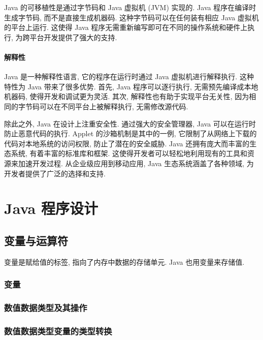 \documentclass[10pt,UTF8]{book} %
\begin{document}
Java 的可移植性是通过字节码和 Java 虚拟机 (JVM) 实现的. Java 程序在编译时生成字节码, 
而不是直接生成机器码. 这种字节码可以在任何装有相应 Java 虚拟机的平台上运行. 
这使得 Java 程序无需重新编写即可在不同的操作系统和硬件上执行, 为跨平台开发提供了强大的支持. 

\subsection{解释性}

Java 是一种解释性语言, 它的程序在运行时通过 Java 虚拟机进行解释执行. 
这种特性为 Java 带来了很多优势. 首先, Java 程序可以逐行执行, 
无需预先编译成本地机器码, 使得开发和调试更为灵活. 
其次, 解释性也有助于实现平台无关性, 因为相同的字节码可以在不同平台上被解释执行, 无需修改源代码. 

\vspace*{1cm}

除此之外,
Java 在设计上注重安全性. 通过强大的安全管理器, Java 可以在运行时防止恶意代码的执行. 
Applet 的沙箱机制是其中的一例, 它限制了从网络上下载的代码对本地系统的访问权限, 
防止了潜在的安全威胁. 
Java 还拥有庞大而丰富的生态系统, 有着丰富的标准库和框架. 
这使得开发者可以轻松地利用现有的工具和资源来加速开发过程. 从企业级应用到移动应用, 
Java 生态系统涵盖了各种领域, 为开发者提供了广泛的选择和支持. 

\newpage
\thispagestyle{empty}

\part{Java 程序设计}

\chapter{变量与运算符}

\quad\quad 变量是赋给值的标签, 指向了内存中数据的存储单元. Java 也用变量来存储值.

\section{变量}
\section{数值数据类型及其操作}

\newpage
\section{数值数据类型变量的类型转换}
\end{document}
